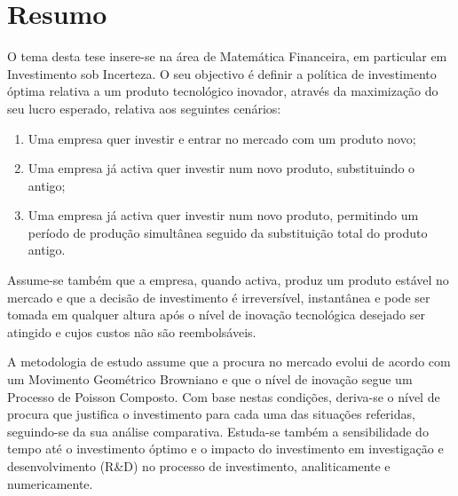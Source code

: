 
\section*{Resumo}



O tema desta tese insere-se na área de Matemática Financeira, em particular em Investimento sob Incerteza. O seu objectivo é definir a política de investimento óptima relativa a um produto tecnológico inovador, através da maximização do seu lucro esperado,
relativa aos seguintes cenários:
\begin{enumerate}
	\item Uma empresa quer investir e entrar no mercado com um produto novo;
	\item Uma empresa já activa quer investir num novo produto, substituindo o antigo; 
	\item Uma empresa já activa quer investir num novo produto, permitindo um período de produção simultânea seguido da substituição total do produto antigo.
\end{enumerate}

Assume-se também que a empresa, quando activa, produz um produto estável no mercado e que a decisão de investimento é irreversível, instantânea e pode ser tomada em qualquer altura após o nível de inovação tecnológica desejado ser atingido e cujos custos não são reembolsáveis.

A metodologia de estudo assume que a procura no mercado
evolui de acordo com um Movimento Geométrico Browniano e que o nível de inovação segue um Processo de Poisson Composto. Com base nestas condições, deriva-se o nível de procura que justifica o investimento para cada uma das situações referidas, seguindo-se da sua análise comparativa. Estuda-se também a sensibilidade do tempo até o investimento óptimo e o impacto do investimento em investigação e desenvolvimento (R\&D) no processo de investimento, analiticamente e numericamente.

